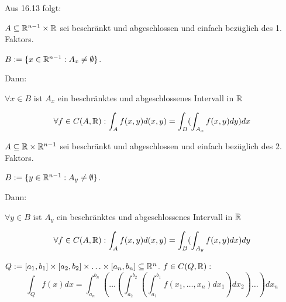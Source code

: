 \documentclass[a4paper,twoside,DIV15,BCOR12mm]{scrbook}
\begin{document}
Aus 16.13 folgt:

\begin{satz}

$A \subseteq \mathbb{R}^{n-1}\times\mathbb{R}$ sei beschränkt und abgeschlossen und einfach bezüglich des 1. Faktors.

$B:=\{x\in\mathbb{R}^{n-1}:A_x\neq\emptyset\}$.

Dann:
\begin{liste}

\item $\forall x \in B$ ist $A_x$ ein beschränktes und abgeschlossenes Intervall in $\mathbb{R}$
\item \[\forall f \in C(A,\mathbb{R}):\int_A f(x,y)d(x,y) = \int_B ( \int_{A_x} f(x,y)dy)dx\]

\end{liste}

$A \subseteq \mathbb{R}\times\mathbb{R}^{n-1}$ sei beschränkt und abgeschlossen und einfach bezüglich des 2. Faktors.

$B:=\{y\in\mathbb{R}^{n-1}:A_y\neq\emptyset\}$.

Dann:
\begin{liste}

\item $\forall y \in B$ ist $A_y$ ein beschränktes und abgeschlossenes Intervall in $\mathbb{R}$
\item \[\forall f \in C(A,\mathbb{R}):\int_A f(x,y)d(x,y) = \int_B ( \int_{A_y} f(x,y)dx)dy\]

\end{liste}
\end{satz}

$Q:=[a_1,b_1]\times[a_2,b_2]\times\ldots\times[a_n,b_n]\subseteq\mathbb{R}^n$.
$f\in C(Q,\mathbb{R}):$
\[\int_Q f(x)dx = \int_{a_n}^{b_n}(\ldots(\int_{a_2}^{b_2}(\int_{a_1}^{b_1}f(x_1,\ldots,x_n)dx_1)dx_2)\ldots)dx_n\]
\end{document}
